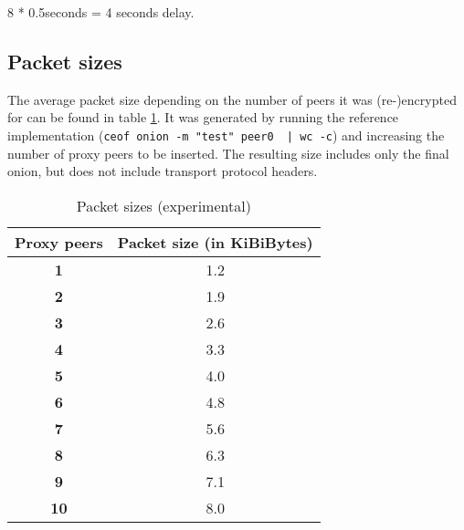 8 * 0.5seconds = 4 seconds delay.


\subsection{Packet sizes}
The average packet size depending on the number of peers it was
(re-)encrypted for can be found in table \ref{pkgsizes}.
It was generated by running the reference implementation
(\verb=ceof onion -m "test" peer0  | wc -c=)
and increasing the number of proxy peers to be inserted.
The resulting size includes only the final onion,
but does not include transport protocol headers.
\begin{longtable}{|c|c|}
\caption{Packet sizes (experimental)}
\label{pkgsizes}\\
\hline
\textbf{Proxy peers} & \textbf{Packet size (in KiBiBytes)}\\
\hline
\textbf{1} & 1.2\\
\hline
\textbf{2} & 1.9\\
\hline
\textbf{3} & 2.6\\
\hline
\textbf{4} & 3.3\\
\hline
\textbf{5} & 4.0\\
\hline
\textbf{6} & 4.8\\
\hline
\textbf{7} & 5.6\\
\hline
\textbf{8} & 6.3\\
\hline
\textbf{9} & 7.1\\
\hline
\textbf{10} & 8.0\\
\hline
\end{longtable}



